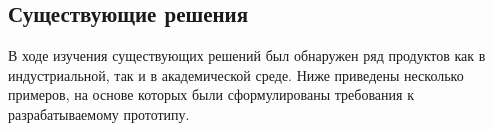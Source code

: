 ﻿\subsection{Существующие решения}
\label{subsections:ExistingSolutions}

В ходе изучения существующих решений был обнаружен ряд продуктов
как в индустриальной, так и в академической среде.
Ниже приведены несколько примеров,
на основе которых были сформулированы требования к разрабатываемому прототипу.




